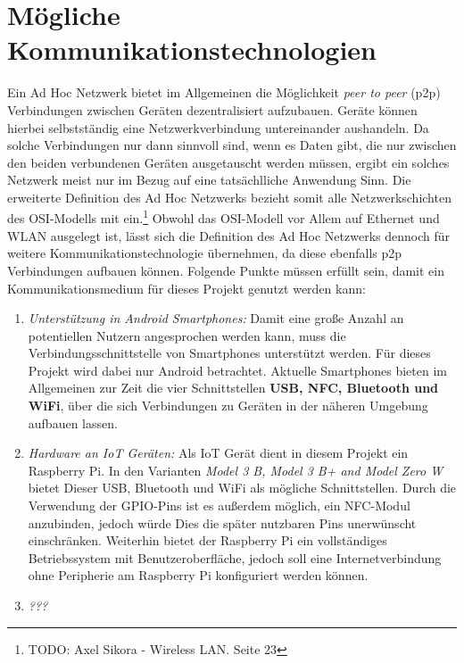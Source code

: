 \documentclass[12pt,a4paper]{article}
\begin{document}
    \section{Mögliche Kommunikationstechnologien}
        Ein Ad Hoc Netzwerk bietet im Allgemeinen die Möglichkeit {\it peer to peer} (p2p) Verbindungen zwischen Geräten dezentralisiert aufzubauen.
        Geräte können hierbei selbstständig eine Netzwerkverbindung untereinander aushandeln. Da solche Verbindungen nur dann sinnvoll sind,
        wenn es Daten gibt, die nur zwischen den beiden verbundenen Geräten ausgetauscht werden müssen, ergibt ein solches Netzwerk meist nur
        im Bezug auf eine tatsächlliche Anwendung Sinn. Die erweiterte Definition des Ad Hoc Netzwerks
        bezieht somit alle Netzwerkschichten des OSI-Modells mit ein.\footnote{TODO: Axel Sikora - Wireless LAN. Seite 23}
        Obwohl das OSI-Modell vor Allem auf Ethernet und WLAN ausgelegt ist, lässt sich die Definition des Ad Hoc Netzwerks
        dennoch für weitere Kommunikationstechnologie übernehmen, da diese ebenfalls p2p Verbindungen aufbauen können.
        Folgende Punkte müssen erfüllt sein, damit ein Kommunikationsmedium für dieses Projekt genutzt werden kann:
        \begin {enumerate}
        \item {\it Unterstützung in Android Smartphones:}
        Damit eine große Anzahl an potentiellen Nutzern angesprochen werden kann, muss die Verbindungsschnittstelle von Smartphones unterstützt werden.
        Für dieses Projekt wird dabei nur Android betrachtet.
        Aktuelle Smartphones bieten im Allgemeinen zur Zeit die vier Schnittstellen {\bf USB, NFC, Bluetooth und WiFi},
        über die sich Verbindungen zu Geräten in der näheren Umgebung aufbauen lassen.
        \item {\it Hardware an IoT Geräten:}
        Als IoT Gerät dient in diesem Projekt ein Raspberry Pi.
        In den Varianten {\it Model 3 B, Model 3 B+ and Model Zero W} bietet Dieser USB, Bluetooth und WiFi als mögliche Schnittstellen.
        Durch die Verwendung der GPIO-Pins ist es außerdem möglich, ein NFC-Modul anzubinden,
        jedoch würde Dies die später nutzbaren Pins unerwünscht einschränken.
        Weiterhin bietet der Raspberry Pi ein vollständiges Betriebssystem mit Benutzeroberfläche, jedoch soll eine Internetverbindung
        ohne Peripherie am Raspberry Pi konfiguriert werden können. 
        \item {\it ???}
        \end {enumerate}
\end{document}

